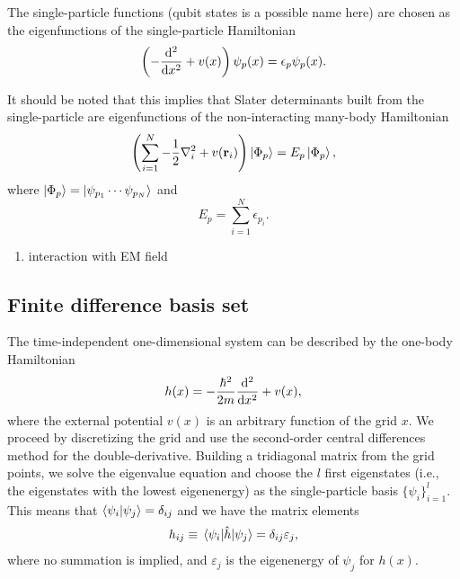 \documentclass[twocolumn,superscriptaddress,unsortedaddress,
 amsmath,amssymb,
 aps,
]{revtex4-2}
\begin{document}
    The single-particle functions (qubit states is a possible name here) are chosen as the eigenfunctions of the single-particle Hamiltonian
    \begin{equation}
        \left( -\dv[2]{}{x}+v(x) \right) \psi_p(x) = \epsilon_p \psi_p(x).
    \end{equation}
    
    It should be noted that this implies that Slater determinants built from the single-particle are eigenfunctions of the non-interacting many-body Hamiltonian
    \begin{equation}
     \left( \sum_{i=1}^N -\frac{1}{2}\laplacian_i + v(\vb{r}_i)  \right) \ket{\Phi_p} = E_p \ket{\Phi_p},
    \end{equation}
    where $\ket{\Phi_p} = \ket{\psi_{p_1}\cdots \psi_{p_N}}$ and 
    \begin{equation}
        E_p = \sum_{i=1}^N \epsilon_{p_i}.
    \end{equation}
    
    \begin{enumerate}
        \item interaction with EM field
    \end{enumerate}
    
    \subsection{Finite difference basis set}
        The time-independent one-dimensional system can be described by the one-body
        Hamiltonian
        \begin{align}
            h(x) = -\frac{\hbar^2}{2m}\dv[2]{}{x}
            + v(x),
        \end{align}
        where the external potential $v(x)$ is an arbitrary function of the grid $x$.
        We proceed by discretizing the grid and use the second-order central differences
        method for the double-derivative.
        Building a tridiagonal matrix from the grid points, we solve the eigenvalue
        equation and choose the $l$ first eigenstates (i.e., the eigenstates with the
        lowest eigenenergy) as the single-particle basis $\{\psi_i\}_{i = 1}^l$.
        This means that $\braket{\psi_i}{\psi_j} = \delta_{ij}$ and we have
        the matrix elements
        \begin{align}
            h_{ij} \equiv \mel{\psi_i}{\hat{h}}{\psi_j}
            = \delta_{ij}\varepsilon_j,
        \end{align}
        where no summation is implied, and $\varepsilon_j$ is the eigenenergy of
        $\psi_j$ for $h(x)$.
\end{document}
